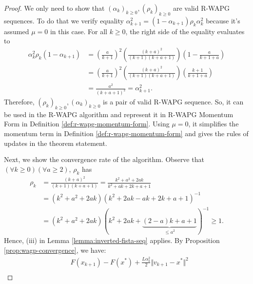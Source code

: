 \documentclass[12pt]{article}
\begin{document}
    \begin{proof}
        We only need to show that $(\alpha_k)_{k \ge 0}, (\rho_k)_{k \ge 0}$ are valid R-WAPG sequences. 
        To do that we verify equality $\alpha_{k + 1}^2 = (1 - \alpha_{k + 1})\rho_k \alpha_k^2$ because it's assumed $\mu = 0$ in this case. 
        For all $k \ge 0$, the right side of the equality evaluates to 
        \begin{align*}
            \alpha_k^2 \rho_k(1 - \alpha_{k + 1}) &= 
            \left(
                \frac{a}{k + 1}
            \right)^2 \left(
                \frac{(k + a)^2}{(k + 1)(k + a + 1)}
            \right)
            \left(
                1 - \frac{a}{k + 1 + a}
            \right)
            \\
            &= \left(
                \frac{a}{k + 1}
            \right)^2 \left(
                \frac{(k + a)^2}{(k + 1)(k + a + 1)}
            \right)
            \left(
                \frac{k + 1}{k + 1 + a}
            \right)
            \\
            &= \frac{a^2}{(k + a + 1)^2} = \alpha_{k + 1}^2. 
        \end{align*}
        Therefore, $(\rho_k)_{k \ge 0}, (\alpha_k)_{k \ge 0}$ is a pair of valid R-WAPG sequence. 
        So, it can be used in the R-WAPG algorithm and represent it in R-WAPG Momentum Form in Definition \ref{def:r-wapg-momentum-form}. 
        Using $\mu = 0$, it simplifies the momentum term in Definition \ref{def:r-wapg-momentum-form} and gives the rules of updates in the theorem statement. 
        \par
        Next, we show the convergence rate of the algorithm. 
        Observe that $(\forall k \ge 0)(\forall a \ge 2)$, $\rho_k$ has 
        \begin{align*}
            \rho_k &= \frac{(k + a)^2}{(k + 1)(k + a + 1)} = \frac{k^2 + a^2 + 2ak}{k^2 + ak + 2k + a + 1}
            \\
            &= (k^2 + a^2 + 2ak)(k^2 + 2ak - ak + 2k + a + 1)^{-1}
            \\
            &= (k^2 + a^2 + 2ak)(k^2 + 2ak + \underbrace{(2 - a)k + a + 1}_{\le a^2})^{-1} \ge 1. 
        \end{align*}
        Hence, (iii) in Lemma \ref{lemma:inverted-fista-seq} applies. 
        By Proposition \ref{prop:wagp-convergence}, we have:
        {\small\begin{align*}
            & F(x_{k + 1}) - F(x^*) + \frac{L\alpha_k^2}{2}\Vert v_{k + 1} - x^*\Vert^2
            \\

\end{align*}}
\end{proof}
\end{document}
